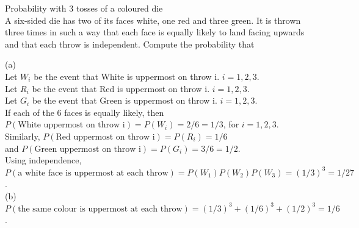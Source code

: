 \documentclass[bigtut]{tutorial}\usepackage[]{graphicx}\usepackage[]{color}
\begin{document}
\begin{tutorial}
\begin{questions}
\begin{solution}
\end{solution}










\question  Probability with 3 tosses of a coloured die \\

A six-sided die has two of its faces white, one red and three green.  It is thrown three times in such a way that  each face is equally likely to land facing upwards and that each throw is independent.
Compute the probability that \\




\begin{solution}
(a) \\
Let $W_{i}$ be the event that White is uppermost on throw i. $i=1,2,3$. \\
Let $R_{i}$ be the event that Red is uppermost on throw i. $i=1,2,3$. \\
Let $G_{i}$ be the event that Green is uppermost on throw i. $i=1,2,3$. \\
 
If each of the 6 faces is equally likely, then $P(\text{White uppermost on throw i}) = P(W_i) = 2/6 = 1/3$, for $i=1,2,3$. \\ 
Similarly, $P(\text{Red uppermost on throw i}) = P(R_i) = 1/6$ \\ 
and $P(\text{Green uppermost on throw i}) = P(G_i) = 3/6 = 1/2$. \\ 
 
Using independence,\\
$P(\text{a white face is uppermost at each throw}) = P(W_{1})P(W_{2})P(W_{3}) = (1/3)^3 = 1/27$. \\

\vspace{.5cm}
(b)
$P(\text{the same colour is uppermost at each throw}) =  (1/3)^3 + (1/6)^3 + (1/2)^3 = 1/6$. \\


\end{solution}
\end{questions}
\end{tutorial}
\end{document}
